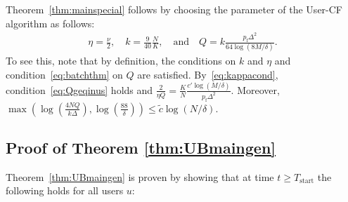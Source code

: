 \documentclass{article}
\newcommand\pf{p_{\mathrm{f}}}
\begin{document}
\indent Theorem~\ref{thm:mainspecial} follows by choosing the parameter of the User-CF algorithm as follows:
\begin{align*}
\eta = \frac{\nu}{2}, 
\quad
k = \frac{9}{40} \frac{N}{K},
\quad 
\text{and}
\quad 
Q =  k 
\frac{\pf \Delta^2 }{64 \log( 8M / \delta)}.
\end{align*}
To see this, note that by definition, the conditions on $k$ and $\eta$ and condition~\eqref{eq:batchthm} on $Q$ are satisfied. 
By~\eqref{eq:kappacond}, condition~\eqref{eq:Qgeqinus} holds and 
$\frac{2}{\eta Q} = \frac{K}{N} \frac{c'\log( M / \delta )}{\pf \Delta^2}$.
Moreover, 
$\max\left(\log\left( \frac{4NQ}{k\Delta} \right), \log \left( \frac{88}{\delta} \right) \right) \leq \tilde c \log(N/\delta)$.  


















\subsection{\label{sec:proof}Proof of Theorem \ref{thm:UBmaingen}}

Theorem~\ref{thm:UBmaingen} is proven by showing that at time $t \geq T_{\text{start}}$ the following holds for all users $u$: 
\end{document}
